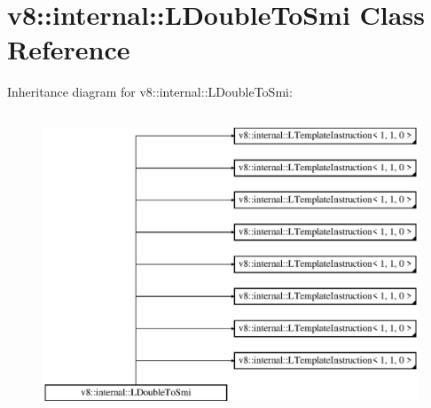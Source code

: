 \hypertarget{classv8_1_1internal_1_1_l_double_to_smi}{}\section{v8\+:\+:internal\+:\+:L\+Double\+To\+Smi Class Reference}
\label{classv8_1_1internal_1_1_l_double_to_smi}
Inheritance diagram for v8\+:\+:internal\+:\+:L\+Double\+To\+Smi\+:\begin{figure}[H]
\begin{center}
\leavevmode
\includegraphics[height=9.000000cm]{classv8_1_1internal_1_1_l_double_to_smi}
\end{center}
\end{figure}
